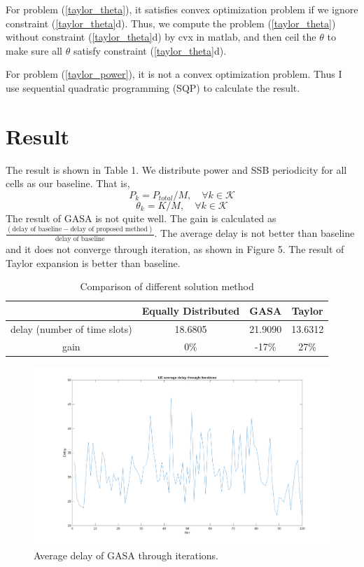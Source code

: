 For problem (\ref{taylor_theta}), it satisfies convex optimization problem if we ignore constraint (\ref{taylor_theta}d). Thus, we compute the problem (\ref{taylor_theta}) without constraint (\ref{taylor_theta}d) by cvx in matlab, and then ceil the $\theta$ to make sure all $\theta$ satisfy constraint (\ref{taylor_theta}d). 

For problem (\ref{taylor_power}), it is not a convex optimization problem. Thus I use sequential quadratic programming (SQP) to calculate the result. 

\section{Result}
The result is shown in Table 1. We distribute power and SSB periodicity for all cells as our baseline. That is, 
\begin{equation}
    P_k = P_{total} / M, \quad \forall k \in \mathcal{K}
\end{equation}
\begin{equation}
    \theta_k = K / M, \quad \forall k \in \mathcal{K}
\end{equation}
The result of GASA is not quite well. The gain is calculated as $\frac{(\text{delay of baseline} - \text{delay of proposed method})}{\text{delay of baseline}}$. The average delay is not better than baseline and it does not converge through iteration, as shown in Figure 5. The result of Taylor expansion is better than baseline. 

\begin{table}[h!]
\centering
\caption{Comparison of different solution method}
\begin{tabular}{|c|c|c|c|}
\hline
    & Equally Distributed & GASA & Taylor \\
\hline
delay (number of time slots) & 18.6805 & 21.9090 & 13.6312 \\
\hline
gain & 0\% & -17\% & 27\% \\
\hline
\end{tabular}
\end{table}

\begin{figure}[h!]
    \centering
    \includegraphics[width=1\textwidth]{thesis_code/result_GASA.png}
    \caption{Average delay of GASA through iterations.}
    \label{GASA iteration}
\end{figure}

